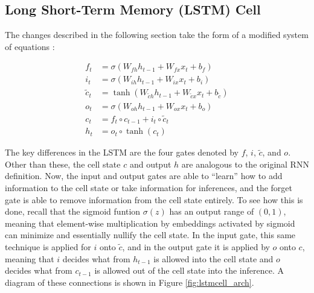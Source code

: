 \documentclass{scrartcl}
\begin{document}
\subsection{Long Short-Term Memory (LSTM) Cell}
\label{subsec:lstm}

The changes described in the following section take the form of a modified
system of equations \cite{rnn_review}: 

\newcommand{\csquig}{\tilde{c}}

\begin{equation}
	\begin{split}
		f_t           & = \sigma ( W_{fh} h_{t - 1} + W_{fx} x_t + b_f ) \\
		i_t           & = \sigma ( W_{ih} h_{t - 1} + W_{ix} x_t + b_i ) \\
		\csquig_t     & = \tanh ( W_{\csquig h} h_{t - 1} + W_{\csquig x} x_t + b_{\csquig} ) \\
		o_t           & = \sigma ( W_{oh} h_{t - 1} + W_{ox} x_t + b_o ) \\
		c_t           & = f_t \circ c_{t - 1} + i_t \circ \tilde{c}_t \\
		h_t           & = o_t \circ \tanh ( c_t )
	\end{split}
	\label{eq:lstm_canonical}
\end{equation}

The key differences in the LSTM are the four gates denoted by $f$, $i$,
$\tilde{c}$, and $o$. Other than these, the cell state $c$ and output $h$ are
analogous to the original RNN definition. Now, the input and output gates are
able to ``learn'' how to add information to the cell state or take information
for inferences, and the forget gate is able to remove information from the cell
state entirely. To see how this is done, recall that the sigmoid funtion
$\sigma (z)$ has an output range of $(0, 1)$, meaning that element-wise
multiplication by embeddings activated by sigmoid can minimize and essentially
nullify the cell state. In the input gate, this same technique is applied for
$i$ onto $\tilde{c}$, and in the output gate it is applied by $o$ onto $c$,
meaning that $i$ decides what from $h_{t - 1}$ is allowed into the cell state
and $o$ decides what from $c_{t - 1}$ is allowed out of the cell state into the
inference. A diagram of these connections is shown in Figure
\ref{fig:lstmcell_arch}.
\end{document}
